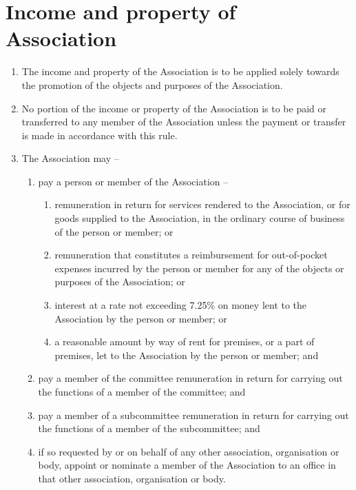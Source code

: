 \section{Income and property of Association}
\label{rule:income}

\begin{enumerate}
	\item The income and property of the Association is to be applied solely towards the promotion of the objects and purposes of the Association.
	\item No portion of the income or property of the Association is to be paid or transferred to any member of the Association unless the payment or transfer is made in accordance with this rule.
	
	\item \label{subrule:income:payingOthers} The Association may --
	\begin{enumerate}
		\item pay a person or member of the Association --
		\begin{enumerate}
			\item \label{subsubrule:income:payingOthers:goodsAndServices} remuneration in return for services rendered to the Association, or for goods supplied to the Association, in the ordinary course of business of the person or member; or
			\item \label{subsubrule:income:payingOthers:expenses} remuneration that constitutes a reimbursement for out-of-pocket expenses incurred by the person or member for any of the objects or purposes of the Association; or
			\item \label{subsubrule:income:payingOthers:interest} interest at a rate not exceeding 7.25\% on money lent to the Association by the person or member; or
			\item \label{subsubrule:income:payingOthers:rent} a reasonable amount by way of rent for premises, or a part of premises, let to the Association by the person or member; and
		\end{enumerate}
		
		\item pay a member of the committee remuneration in return for carrying out the functions of a member of the committee; and
		\item pay a member of a subcommittee remuneration in return for carrying out the functions of a member of the subcommittee; and
		\item if so requested by or on behalf of any other association, organisation or body, appoint or nominate a member of the Association to an office in that other association, organisation or body.
	\end{enumerate}
	

\end{enumerate}
